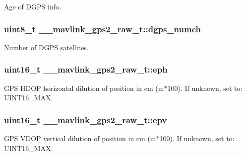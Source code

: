 Age of D\+G\+P\+S info. 

\hypertarget{struct____mavlink__gps2__raw__t_ac6a3259c7b17d851e240898945a63df7}{
\subsubsection[{dgps\+\_\+numch}]{\setlength{\rightskip}{0pt plus 5cm}uint8\+\_\+t \+\_\+\+\_\+mavlink\+\_\+gps2\+\_\+raw\+\_\+t\+::dgps\+\_\+numch}}\label{struct____mavlink__gps2__raw__t_ac6a3259c7b17d851e240898945a63df7}


Number of D\+G\+P\+S satellites. 

\hypertarget{struct____mavlink__gps2__raw__t_a332355622e75f6041e6bd8fd516b7039}{
\subsubsection[{eph}]{\setlength{\rightskip}{0pt plus 5cm}uint16\+\_\+t \+\_\+\+\_\+mavlink\+\_\+gps2\+\_\+raw\+\_\+t\+::eph}}\label{struct____mavlink__gps2__raw__t_a332355622e75f6041e6bd8fd516b7039}


G\+P\+S H\+D\+O\+P horizontal dilution of position in cm (m$\ast$100). If unknown, set to\+: U\+I\+N\+T16\+\_\+\+M\+A\+X. 

\hypertarget{struct____mavlink__gps2__raw__t_abe56b345d635dfc3ad3b4b8a3a28ea90}{
\subsubsection[{epv}]{\setlength{\rightskip}{0pt plus 5cm}uint16\+\_\+t \+\_\+\+\_\+mavlink\+\_\+gps2\+\_\+raw\+\_\+t\+::epv}}\label{struct____mavlink__gps2__raw__t_abe56b345d635dfc3ad3b4b8a3a28ea90}


G\+P\+S V\+D\+O\+P vertical dilution of position in cm (m$\ast$100). If unknown, set to\+: U\+I\+N\+T16\+\_\+\+M\+A\+X. 

